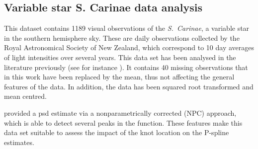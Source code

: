 \documentclass[twocolumn,final]{svjour3}
\begin{document}

\subsection{Variable star S. Carinae data analysis}

This dataset contains 1189 visual observations of the {\it S.\ Carinae}, a variable star in the southern hemisphere sky.  These are daily observations collected by the Royal Astronomical Society of New Zealand, which correspond to 10 day averages of light intensities over several years.  This data set has been analysed in the literature previously (see for instance \cite{Cart:1997,Huerta:1999,Kirch:2018}).  It contains 40 missing observations that in this work have been replaced by the mean, thus not affecting the general features of the data.  In addition, the data has been squared root transformed and mean centred.  

\cite{Kirch:2018} provided a psd estimate via a nonparametrically corrected (NPC) approach, which is able to detect several peaks in the function.  These features make this data set suitable to assess the impact of the knot location on the P-spline estimates. 
\end{document}
